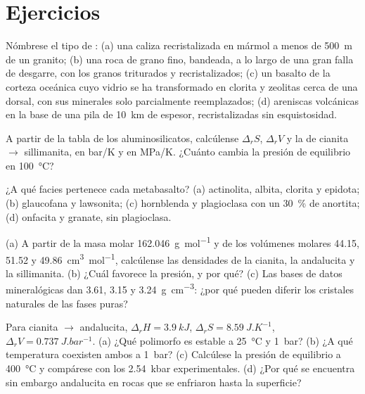 \section{Ejercicios}

\begin{exercise}[$\star$]\label{exo:b2:metamorphic-facies:1}
Nómbrese el tipo de : (a) una caliza recristalizada en mármol a menos de
\qty{500}{m} de un granito; (b) una roca de grano fino, bandeada, a lo largo de una gran falla
de desgarre, con los granos triturados y recristalizados; (c) un basalto de la corteza oceánica cuyo
vidrio se ha transformado en clorita y zeolitas cerca de una dorsal, con sus minerales solo parcialmente
reemplazados; (d) areniscas volcánicas en la base de una pila de \qty{10}{km} de espesor,
recristalizadas sin esquistosidad.
\end{exercise}

\begin{exercise}[$\star$]\label{exo:b2:metamorphic-facies:2}
A partir de la tabla de los aluminosilicatos, calcúlense $\Delta_r S$, $\Delta_r V$ y la
 de cianita $\to$ sillimanita, en \unit{bar/K} y en \unit{MPa/K}. ¿Cuánto
cambia la presión de equilibrio en \qty{100}{\celsius}?
\end{exercise}

\begin{exercise}[$\star$]\label{exo:b2:metamorphic-facies:3}
¿A qué facies pertenece cada metabasalto? (a) actinolita, albita, clorita y
epidota; (b) glaucofana y lawsonita; (c) hornblenda y plagioclasa con un
\qty{30}{\percent} de anortita; (d) onfacita y granate, sin plagioclasa.
\end{exercise}

\begin{exercise}[$\star$]\label{exo:b2:metamorphic-facies:4}
(a) A partir de la masa molar \qty{162.046}{g.mol^{-1}} y de los volúmenes molares 44.15, 51.52 y
\qty{49.86}{cm^3.mol^{-1}}, calcúlense las densidades de la cianita, la andalucita y la sillimanita.
(b) ¿Cuál favorece la presión, y por qué? (c) Las bases de datos mineralógicas dan 3.61, 3.15 y
\qty{3.24}{g.cm^{-3}}: ¿por qué pueden diferir los cristales naturales de las fases puras?
\end{exercise}

\begin{exercise}[$\star\star$]\label{exo:b2:metamorphic-facies:5}
Para cianita $\to$ andalucita, $\Delta_r H = \qty{3.9}{kJ}$, $\Delta_r S =
\qty{8.59}{J.K^{-1}}$, $\Delta_r V = \qty{0.737}{J.bar^{-1}}$. (a) ¿Qué polimorfo es
estable a \qty{25}{\celsius} y \qty{1}{bar}? (b) ¿A qué temperatura coexisten ambos
a \qty{1}{bar}? (c) Calcúlese la presión de equilibrio a \qty{400}{\celsius} y
compárese con los \qty{2.54}{kbar} experimentales. (d) ¿Por qué se encuentra sin embargo andalucita
en rocas que se enfriaron hasta la superficie?
\end{exercise}

